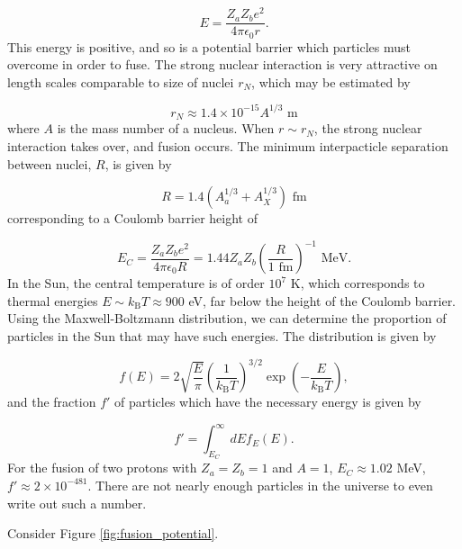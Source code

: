 \documentclass[12pt]{article}
\newcommand{\bigparenthesis}[1]{\left(#1\right)}
\begin{document}
\begin{equation}
    E = \frac{Z_a Z_b e^2}{4\pi \epsilon_0 r}.
\end{equation}
%
This energy is positive, and so is a potential barrier which particles must overcome in order to fuse. The strong nuclear interaction is very attractive on length scales comparable to size of nuclei $r_N$, which may be estimated by

\begin{equation}
    r_N \approx 1.4 \times 10^{-15} A^{1/3}  \text{ m}
\end{equation}
%
where $A$ is the mass number of a nucleus. When $r \sim r_N$, the strong nuclear interaction takes over, and fusion occurs. The minimum interpacticle separation between nuclei, $R$, is given by

\begin{equation}
    R = 1.4 (A_a^{1/3} + A_X^{1/3}) \text{ fm}
\end{equation}
%
corresponding to a Coulomb barrier height of 

\begin{equation}
    E_C = \frac{Z_a Z_b e^2}{4\pi \epsilon_0 R} = 1.44 Z_a Z_b \bigparenthesis{\frac{R}{1 \text{ fm}}}^{-1} \text{ MeV}.
\end{equation}
%
In the Sun, the central temperature is of order $10^7$ K, which corresponds to thermal energies $E \sim k_\mathrm{B}T \approx 900$ eV, far below the height of the Coulomb barrier. Using the Maxwell-Boltzmann distribution, we can determine the proportion of particles in the Sun that may have such energies. The distribution is given by

\begin{equation}
    f(E) = 2\sqrt{\frac{E}{\pi}} \bigparenthesis{\frac{1}{k_\mathrm{B}T}}^{3/2} \exp\bigparenthesis{-\frac{E}{k_\mathrm{B}T}},
\end{equation}
%
and the fraction $f'$ of particles which have the necessary energy is given by

\begin{equation}
    f' = \int_{E_C}^{\infty} dE f_E(E).
\end{equation}
%
For the fusion of two protons with $Z_a = Z_b = 1$ and $A = 1$, $E_C \approx 1.02$ MeV, $f' \approx 2 \times 10^{-481}$. There are not nearly enough particles in the universe to even write out such a number.

Consider Figure \ref{fig:fusion_potential}.
\end{document}
